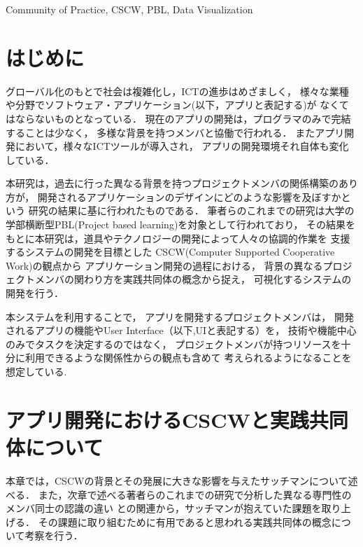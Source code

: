 \documentclass[submit,techrep]{ipsj}
\begin{document}
\begin{ekeyword}
Community of Practice, CSCW, PBL, Data Visualization
\end{ekeyword}

\maketitle

\section{はじめに}

グローバル化のもとで社会は複雑化し，ICTの進歩はめざましく，
様々な業種や分野でソフトウェア・アプリケーション(以下，アプリと表記する)が
なくてはならないものとなっている．
現在のアプリの開発は，プログラマのみで完結することは少なく，
多様な背景を持つメンバと協働で行われる．
またアプリ開発において，様々なICTツールが導入され，
アプリの開発環境それ自体も変化している．


本研究は，過去に行った異なる背景を持つプロジェクトメンバの関係構築のあり方が，
開発されるアプリケーションのデザインにどのような影響を及ぼすかという
研究\cite{book1}の結果に基に行われたものである．
筆者らのこれまでの研究は大学の学部横断型PBL(Project based learning)を対象として行われており，
その結果をもとに本研究は，道具やテクノロジーの開発によって人々の協調的作業を
支援するシステムの開発を目標とした
CSCW(Computer Supported Cooperative Work)\cite{book2}の観点から
アプリケーション開発の過程における，
背景の異なるプロジェクトメンバの関わり方を実践共同体の概念から捉え，
可視化するシステムの開発を行う．


本システムを利用することで，
アプリを開発するプロジェクトメンバは，
開発されるアプリの機能やUser Interface（以下,UIと表記する）を，
技術や機能中心のみでタスクを決定するのではなく，
プロジェクトメンバが持つリソースを十分に利用できるような関係性からの観点も含めて
考えられるようになることを想定している.


\section{アプリ開発におけるCSCWと実践共同体について}
\label{previous-research-cscw}

本章では，CSCWの背景とその発展に大きな影響を与えたサッチマンについて述べる．
また，次章で述べる著者らのこれまでの研究で分析した異なる専門性のメンバ同士の認識の違い
との関連から，サッチマンが抱えていた課題を取り上げる．
その課題に取り組むために有用であると思われる実践共同体の概念について考察を行う．
\end{document}

